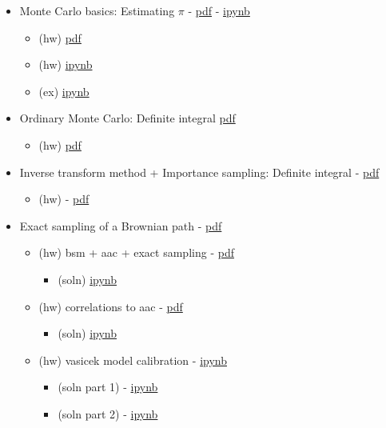 \documentclass[11pt]{article}
\providecommand{\tightlist}{%
      \setlength{\itemsep}{0pt}\setlength{\parskip}{0pt}}
\begin{document}
\begin{itemize}
\tightlist
\item
  Monte Carlo basics: Estimating \(\pi\) -
  \href{./doc/pi_mc_01.pdf}{pdf} -
  \href{https://github.com/songqsh/18ma573pub/blob/master/src/pi.ipynb}{ipynb}

  \begin{itemize}
  \tightlist
  \item
    (hw) \href{doc/hw_mc_01.pdf}{pdf}
  \item
    (hw)
    \href{https://github.com/songqsh/18ma573pub/blob/master/src/hw_mc_02.ipynb}{ipynb}
  \item
    (ex) \href{src/ex_omc_01.ipynb}{ipynb}
  \end{itemize}
\item
  Ordinary Monte Carlo: Definite integral
  \href{https://github.com/songqsh/18ma573pub/blob/master/doc/omc_integral_01.pdf}{pdf}

  \begin{itemize}
  \tightlist
  \item
    (hw) \href{doc/hw_omc_integral.pdf}{pdf}
  \end{itemize}
\item
  Inverse transform method + Importance sampling: Definite integral -
  \href{./doc/is_it_integral.pdf}{pdf}

  \begin{itemize}
  \tightlist
  \item
    (hw) - \href{./doc/hw_is_it_integral.pdf}{pdf}
  \end{itemize}
\item
  Exact sampling of a Brownian path - \href{doc/bm_1d.pdf}{pdf}

  \begin{itemize}
  \tightlist
  \item
    (hw) bsm + aac + exact sampling -
    \href{doc/hw_exact_sample.pdf}{pdf}

    \begin{itemize}
    \tightlist
    \item
      (soln) \href{src/soln_exact_sample.ipynb}{ipynb}
    \end{itemize}
  \item
    (hw) correlations to aac - \href{doc/hw_payoff_correlation.pdf}{pdf}

    \begin{itemize}
    \tightlist
    \item
      (soln) \href{src/soln_payoff_correlation.ipynb}{ipynb}
    \end{itemize}
  \item
    (hw) vasicek model calibration -
    \href{src/hw_vasicek_calibration.ipynb}{ipynb}

    \begin{itemize}
    \tightlist
    \item
      (soln part 1) -
      \href{src/hw_vasicek_calibration_soln_part1.ipynb}{ipynb}
    \item
      (soln part 2) -
      \href{src/calibration_vasicek_libor_swap_part2.ipynb}{ipynb}
    \end{itemize}
  \end{itemize}
\end{itemize}
\end{document}
